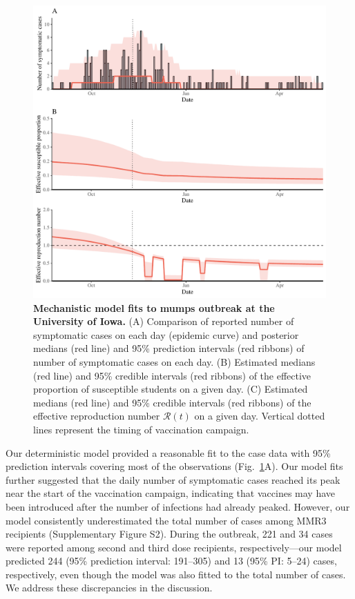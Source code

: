 \documentclass[12pt]{article}
\newcommand{\fref}[1]{Fig.~\ref{fig:#1}}
\begin{document}
\begin{figure}[!th]
\includegraphics[width=1\textwidth]{../figure_stanfit_seirv_final/figure_stanfit_trajectory.pdf}
\caption{
\textbf{Mechanistic model fits to mumps outbreak at the University of Iowa.}
(A) Comparison of reported number of symptomatic cases on each day (epidemic curve) and posterior medians (red line) and 95\% prediction intervals (red ribbons) of number of symptomatic cases on each day.
(B) Estimated medians (red line) and 95\% credible intervals (red ribbons) of the effective proportion of susceptible students on a given day.
(C) Estimated medians (red line) and 95\% credible intervals (red ribbons) of the effective reproduction number $\mathcal R(t)$ on a given day.
Vertical dotted lines represent the timing of vaccination campaign.
}
\label{fig:fit}
\end{figure}

Our deterministic model provided a reasonable fit to the case data with 95\% prediction intervals covering most of the observations (\fref{fit}A).
Our model fits further suggested that the daily number of symptomatic cases reached its peak near the start of the vaccination campaign, indicating that vaccines may have been introduced after the number of infections had already peaked.
However, our model consistently underestimated the total number of cases among MMR3 recipients (Supplementary Figure S2).
During the outbreak, 221 and 34 cases were reported among second and third dose recipients, respectively---our model predicted 244 (95\% prediction interval: 191--305) and 13 (95\% PI: 5--24) cases, respectively, even though the model was also fitted to the total number of cases.
We address these discrepancies in the discussion.
\end{document}
